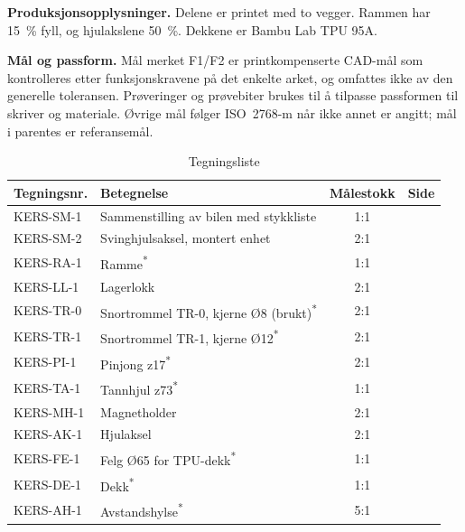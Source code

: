 \textbf{Produksjonsopplysninger.} Delene er printet med to vegger. Rammen har 15~\% fyll, og hjulakslene 50~\%. Dekkene er Bambu Lab TPU 95A.

\textbf{Mål og passform.} Mål merket F1/F2 er printkompenserte CAD-mål som kontrolleres etter funksjonskravene på det enkelte arket, og omfattes ikke av den generelle toleransen. Prøveringer og prøvebiter brukes til å tilpasse passformen til skriver og materiale. Øvrige mål følger ISO~2768-m når ikke annet er angitt; mål i parentes er referansemål.


\begin{table}[H]
    \centering
    \caption{Tegningsliste}
    \label{tab:tegningsliste}
    \small
    \renewcommand{\arraystretch}{1.25}
    \begin{tabular}{|l|l|c|c|}
        \hline
        \textbf{Tegningsnr.} & \textbf{Betegnelse} & \textbf{Målestokk} & \textbf{Side} \\
        \hline
        KERS-SM-1 & Sammenstilling av bilen med stykkliste & 1:1 & \pageref{tegn:SM-1} \\
        KERS-SM-2 & Svinghjulsaksel, montert enhet & 2:1 & \pageref{tegn:SM-2} \\
        KERS-RA-1 & Ramme\textsuperscript{*} & 1:1 & \pageref{tegn:RA-1} \\
        KERS-LL-1 & Lagerlokk & 2:1 & \pageref{tegn:LL-1} \\
        KERS-TR-0 & Snortrommel TR-0, kjerne Ø8 (brukt)\textsuperscript{*} & 2:1 & \pageref{tegn:TR-0} \\
        KERS-TR-1 & Snortrommel TR-1, kjerne Ø12\textsuperscript{*} & 2:1 & \pageref{tegn:TR-1} \\
        KERS-PI-1 & Pinjong z17\textsuperscript{*} & 2:1 & \pageref{tegn:PI-1} \\
        KERS-TA-1 & Tannhjul z73\textsuperscript{*} & 1:1 & \pageref{tegn:TA-1} \\
        KERS-MH-1 & Magnetholder & 2:1 & \pageref{tegn:MH-1} \\
        KERS-AK-1 & Hjulaksel & 2:1 & \pageref{tegn:AK-1} \\
        KERS-FE-1 & Felg Ø65 for TPU-dekk\textsuperscript{*} & 1:1 & \pageref{tegn:FE-1} \\
        KERS-DE-1 & Dekk\textsuperscript{*} & 1:1 & \pageref{tegn:DE-1} \\
        KERS-AH-1 & Avstandshylse\textsuperscript{*} & 5:1 & \pageref{tegn:AH-1} \\
        \hline
    \end{tabular}
\end{table}

